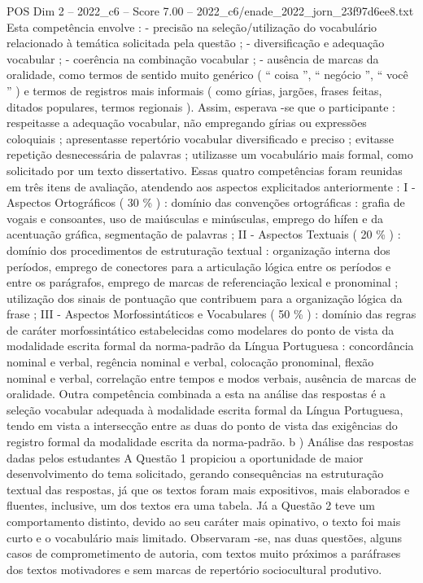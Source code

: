 \begin{textsample}{POS Dim 2 – 2022\_c6 – Score 7.00 – 2022\_c6/enade\_2022\_jorn\_23f97d6ee8.txt}
Esta competência envolve : - precisão na seleção/utilização do vocabulário relacionado à temática solicitada pela questão ; - diversificação e adequação vocabular ; - coerência na combinação vocabular ; - ausência de marcas da oralidade, como termos de sentido muito genérico ( “ coisa ”, “ negócio ”, “ você ” ) e termos de registros mais informais ( como gírias, jargões, frases feitas, ditados populares, termos regionais ).
Assim, esperava -se que o participante : respeitasse a adequação vocabular, não empregando gírias ou expressões coloquiais ; apresentasse repertório vocabular diversificado e preciso ; evitasse repetição desnecessária de palavras ; utilizasse um vocabulário mais formal, como solicitado por um texto dissertativo.
Essas quatro competências foram reunidas em três itens de avaliação, atendendo aos aspectos explicitados anteriormente : I - Aspectos Ortográficos ( 30 \% ) : domínio das convenções ortográficas : grafia de vogais e consoantes, uso de maiúsculas e minúsculas, emprego do hífen e da acentuação gráfica, segmentação de palavras ; II - Aspectos Textuais ( 20 \% ) : domínio dos procedimentos de estruturação textual : organização interna dos períodos, emprego de conectores para a articulação lógica entre os períodos e entre os parágrafos, emprego de marcas de referenciação lexical e pronominal ; utilização dos sinais de pontuação que contribuem para a organização lógica da frase ; III - Aspectos Morfossintáticos e Vocabulares ( 50 \% ) : domínio das regras de caráter morfossintático estabelecidas como modelares do ponto de vista da modalidade escrita formal da norma-padrão da Língua Portuguesa : concordância nominal e verbal, regência nominal e verbal, colocação pronominal, flexão nominal e verbal, correlação entre tempos e modos verbais, ausência de marcas de oralidade.
Outra competência combinada a esta na análise das respostas é a seleção vocabular adequada à modalidade escrita formal da Língua Portuguesa, tendo em vista a intersecção entre as duas do ponto de vista das exigências do registro formal da modalidade escrita da norma-padrão. b ) Análise das respostas dadas pelos estudantes A Questão 1 propiciou a oportunidade de maior desenvolvimento do tema solicitado, gerando consequências na estruturação textual das respostas, já que os textos foram mais expositivos, mais elaborados e fluentes, inclusive, um dos textos era uma tabela.
Já a Questão 2 teve um comportamento distinto, devido ao seu caráter mais opinativo, o texto foi mais curto e o vocabulário mais limitado.
Observaram -se, nas duas questões, alguns casos de comprometimento de autoria, com textos muito próximos a paráfrases dos textos motivadores e sem marcas de repertório sociocultural produtivo.

\end{textsample}
